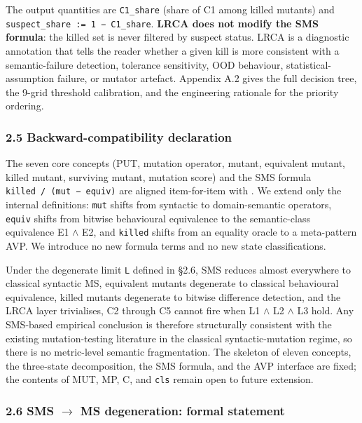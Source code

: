 \documentclass[review,12pt,authoryear]{elsarticle}
\begin{document}
The output quantities are \texttt{C1\_share} (share of C1 among killed
mutants) and \texttt{suspect\_share\ :=\ 1\ −\ C1\_share}. \textbf{LRCA
does not modify the SMS formula}: the killed set is never filtered by
suspect status. LRCA is a diagnostic annotation that tells the reader
whether a given kill is more consistent with a semantic-failure
detection, tolerance sensitivity, OOD behaviour, statistical-assumption
failure, or mutator artefact. Appendix A.2 gives the full decision tree, the 9-grid
threshold calibration, and the engineering rationale for the priority
ordering.

\subsubsection{2.5 Backward-compatibility declaration}\label{backward-compatibility-declaration}

The seven core concepts (PUT, mutation operator, mutant, equivalent
mutant, killed mutant, surviving mutant, mutation score) and the SMS
formula
\texttt{\textbar{}killed\textbar{}\ /\ (\textbar{}mut\textbar{}\ −\ \textbar{}equiv\textbar{})}
are aligned item-for-item with \citet{d7c38286734419b52de4262c9802ebdfcf4b9447}. We extend only the
internal definitions: \texttt{mut} shifts from syntactic to
domain-semantic operators, \texttt{equiv} shifts from bitwise
behavioural equivalence to the semantic-class equivalence E1 $\wedge$ E2, and
\texttt{killed} shifts from an equality oracle to a meta-pattern AVP. We
introduce no new formula terms and no new state classifications.

Under the degenerate limit \texttt{L} defined in §2.6, SMS reduces
almost everywhere to classical syntactic MS, equivalent mutants
degenerate to classical behavioural equivalence, killed mutants
degenerate to bitwise difference detection, and the LRCA layer
trivialises, C2 through C5 cannot fire when L1 $\wedge$ L2 $\wedge$ L3 hold. Any
SMS-based empirical conclusion is therefore structurally consistent with
the existing mutation-testing literature in the classical
syntactic-mutation regime, so there is no metric-level semantic
fragmentation. The skeleton of eleven concepts, the three-state
decomposition, the SMS formula, and the AVP interface are fixed; the
contents of MUT, MP, C, and \texttt{cls} remain open to future
extension.

\subsubsection{2.6 SMS $\to$ MS degeneration: formal statement}\label{sms-ms-degeneration-formal-statement}
\end{document}
